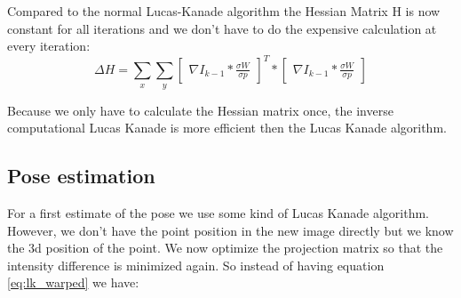 \documentclass[11pt,a4paper,titlepage,oneside]{report}
\begin{document}
Compared to the normal Lucas-Kanade algorithm the Hessian Matrix H is now constant for all iterations and we don't have to do the expensive calculation at every iteration:
\begin{equation}
	\Delta H=\sum_x\sum_y\begin{bmatrix}\nabla I_{k-1}*\frac{\sigma W}{\sigma p}\end{bmatrix}^T*\begin{bmatrix}\nabla I_{k-1}*\frac{\sigma W}{\sigma p}\end{bmatrix}
\end{equation}

Because we only have to calculate the Hessian matrix once, the inverse computational Lucas Kanade is more efficient then the Lucas Kanade algorithm.

\subsection{Pose estimation}
For a first estimate of the pose we use some kind of Lucas Kanade algorithm. However, we don't have the point position in the new image directly but we know the 3d position of the point. We now optimize the projection matrix so that the intensity difference is minimized again. So instead of having equation \ref{eq:lk_warped} we have:
\end{document}
